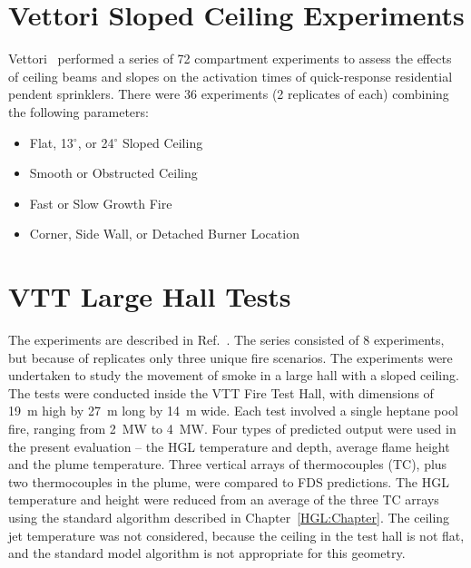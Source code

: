\section{Vettori Sloped Ceiling Experiments}

Vettori~\cite{Vettori:2} performed a series of 72 compartment experiments to assess the effects of ceiling beams and slopes on the activation times of quick-response residential pendent sprinklers. There were 36 experiments (2 replicates of each) combining the following parameters:
\begin{itemize}
\item Flat, 13$^\circ$, or 24$^\circ$ Sloped Ceiling
\item Smooth or Obstructed Ceiling
\item Fast or Slow Growth Fire
\item Corner, Side Wall, or Detached Burner Location
\end{itemize}


\clearpage


\section{VTT Large Hall Tests}

The experiments are described in Ref.~\cite{Hostikka:VTT2104}. The series consisted of 8 experiments, but because of replicates only three unique fire
scenarios. The experiments were undertaken to study the movement of smoke in a large hall with a sloped ceiling. The tests were conducted inside the
VTT Fire Test Hall, with dimensions of 19~m high by 27~m long by 14~m wide. Each test involved a single heptane pool fire, ranging from 2~MW to 4~MW.
Four types of predicted output were used in the present evaluation -- the HGL temperature and depth, average flame height and the plume
temperature. Three vertical arrays of thermocouples (TC), plus two thermocouples in the plume, were compared to FDS predictions. The HGL
temperature and height were reduced from an average of the three TC
arrays using the standard algorithm described in
Chapter~\ref{HGL:Chapter}. The ceiling jet temperature was not
considered, because the ceiling in the test hall is not flat, and the
standard model algorithm is not appropriate for this geometry.


